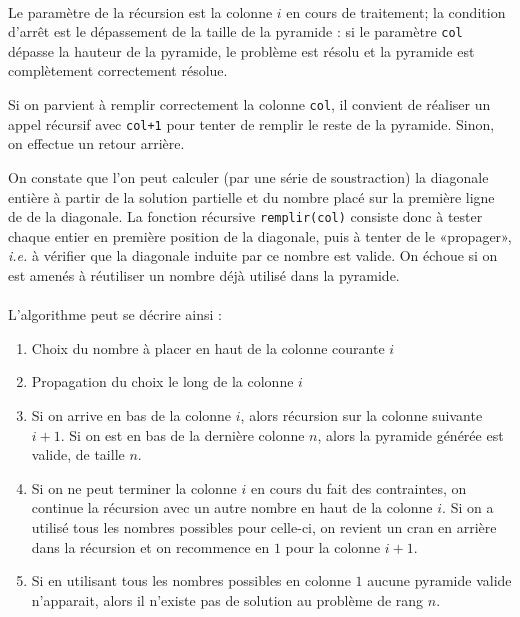 \documentclass[10pt]{article}%
\begin{document}
  \paragraph*{}
  Le paramètre de la récursion est la colonne $i$ en cours de traitement; la
  condition d'arrêt est le dépassement de la taille de la pyramide : si le
  paramètre \texttt{col} dépasse la hauteur de la pyramide, le problème est
  résolu et la pyramide est complètement correctement résolue.

  Si on parvient à remplir correctement la colonne \texttt{col}, il convient
  de réaliser un appel récursif avec \texttt{col+1} pour tenter de remplir le
  reste de la pyramide. Sinon, on effectue un retour arrière.

  On constate que l'on peut calculer (par une série de soustraction) la
  diagonale entière à partir de la solution partielle et du nombre placé sur la
  première ligne de de la diagonale. La fonction récursive
  \texttt{remplir(col)} consiste donc à tester chaque entier en première
  position de la diagonale, puis à tenter de le «propager», \textit{i.e.} à
  vérifier que la diagonale induite par ce nombre est valide. On échoue si on
  est amenés à réutiliser un nombre déjà utilisé dans la pyramide.

\paragraph*{}
  L'algorithme peut se décrire ainsi :
  \begin{enumerate}
    \item Choix du nombre à placer en haut de la colonne courante $i$
    \item Propagation du choix le long de la colonne $i$
    \item Si on arrive en bas de la colonne $i$, alors récursion sur la colonne suivante $i+1$.
      Si on est en bas de la dernière colonne $n$, alors la pyramide générée est valide, de taille $n$.
    \item Si on ne peut terminer la colonne $i$ en cours du fait des contraintes, on continue la récursion
      avec un autre nombre en haut de la colonne $i$. Si on a utilisé tous les nombres possibles
      pour celle-ci, on revient un cran en arrière dans la récursion et on recommence en $1$ pour la colonne $i+1$.
    \item Si en utilisant tous les nombres possibles en colonne $1$ aucune pyramide valide n'apparait, alors il
      n'existe pas de solution au problème de rang $n$.
  \end{enumerate}
\end{document}
